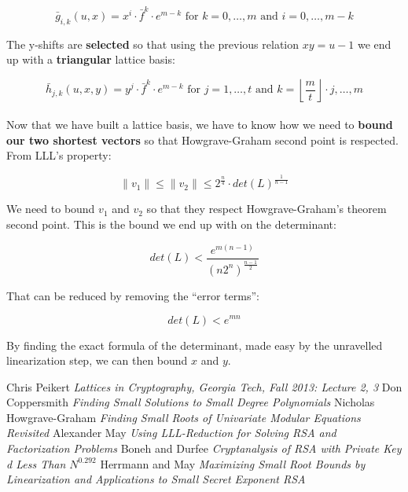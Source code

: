 \documentclass[a4paper,11pt]{article}
\begin{document}
\[ \bar{g}_{i,k}(u,x) = x^i \cdot \bar{f}^k \cdot e^{m-k} \text{ for } k = 0,\hdots,m \text{ and } i=0,\hdots,m-k \]

The y-shifts are \textbf{selected} so that using the previous relation $xy = u - 1$ we end up with a \textbf{triangular} lattice basis:

\[ \bar{h}_{j,k}(u,x,y) = y^j \cdot \bar{f}^k \cdot e^{m-k} \text{ for } j = 1,\hdots,t \text{ and } k=\left\lfloor\frac{m}{t}\right\rfloor\cdot j,\hdots,m \]\\

Now that we have built a lattice basis, we have to know how we need to \textbf{bound our two shortest vectors} so that Howgrave-Graham second point is respected. From LLL's property:

\[ \|v_1\| \leq \|v_2\| \leq 2^{\frac{n}{4}} \cdot det(L)^{\frac{1}{n-1}} \]

We need to bound $v_1$ and $v_2$ so that they respect Howgrave-Graham's theorem second point. This is the bound we end up with on the determinant:

\[ det(L) < \frac{e^{m(n-1)}}{(n2^n)^{\frac{n-1}{2}}} \]

That can be reduced by removing the ``error terms'':

\[ det(L) < e^{mn} \]

By finding the exact formula of the determinant, made easy by the unravelled linearization step, we can then bound $x$ and $y$.

\newpage
\begin{thebibliography}{1}

 Chris Peikert {\em Lattices in Cryptography, Georgia Tech, Fall 2013: Lecture 2, 3}
 Don Coppersmith {\em Finding Small Solutions to Small Degree Polynomials}
 Nicholas Howgrave-Graham {\em Finding Small Roots of Univariate Modular Equations Revisited}
 Alexander May {\em Using LLL-Reduction for Solving RSA and Factorization Problems}
 Boneh and Durfee {\em Cryptanalysis of RSA with Private Key d Less Than $N^{0.292}$}
 Herrmann and May {\em Maximizing Small Root Bounds by Linearization and Applications to Small Secret Exponent RSA}


\end{thebibliography}
\end{document}
